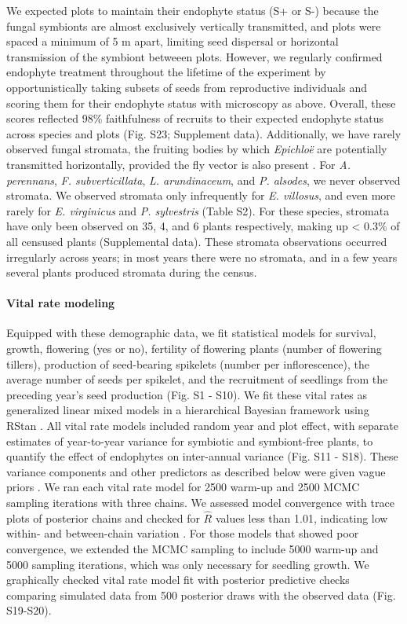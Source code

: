 \documentclass[12pt]{article}
\begin{document}
We expected plots to maintain their endophyte status (S+ or S-) because the fungal symbionts are almost exclusively vertically transmitted, and plots were spaced a minimum of 5 m apart, limiting seed dispersal or horizontal transmission of the symbiont betweeen plots. 
However, we regularly confirmed endophyte treatment throughout the lifetime of the experiment by opportunistically taking subsets of seeds from reproductive individuals and scoring them for their endophyte status with microscopy as above.
Overall, these scores reflected 98\% faithfulness of recruits to their expected endophyte status across species and plots (Fig. S23; Supplement data). 
Additionally, we have rarely observed fungal stromata, the fruiting bodies by which \emph{Epichlo\"e} are potentially transmitted horizontally, provided the fly vector is also present \cite{bultman1995mutualistic}. 
For \emph{A. perennans}, \emph{F. subverticillata}, \emph{L. arundinaceum}, and \emph{P. alsodes}, we never observed stromata. 
We observed stromata only infrequently for \emph{E. villosus}, and even more rarely for \emph{E. virginicus} and \emph{P. sylvestris} (Table S2). 
For these species, stromata have only been observed on 35, 4, and 6 plants respectively, making up < 0.3\% of all censused plants (Supplemental data).
These stromata observations occurred irregularly across years; in most years there were no stromata, and in a few years several plants produced stromata during the census. 

\paragraph*{Vital rate modeling}
Equipped with these demographic data, we fit statistical models for survival, growth, flowering (yes or no), fertility of flowering plants (number of flowering tillers), production of seed-bearing spikelets (number per inflorescence), the average number of seeds per spikelet, and the recruitment of seedlings from the preceding year's seed production (Fig. S1 - S10).  
We fit these vital rates as generalized linear mixed models in a hierarchical Bayesian framework using RStan \cite{rstan2022}. 
All vital rate models included random year and plot effect, with separate estimates of year-to-year variance for symbiotic and symbiont-free plants, to quantify the effect of endophytes on inter-annual variance (Fig. S11 - S18).
These variance components and other predictors as described below were given vague priors \cite{gabry2019visualization}.
We ran each vital rate model for 2500 warm-up and 2500 MCMC sampling iterations with three chains. 
We assessed model convergence with trace plots of posterior chains and checked for $\hat{R}$ values less than 1.01, indicating low within- and between-chain variation \cite{brooks1998general,gelman2006data}. 
For those models that showed poor convergence, we extended the MCMC sampling to include 5000 warm-up and 5000 sampling iterations, which was only necessary for seedling growth. 
We graphically checked vital rate model fit with posterior predictive checks comparing simulated data from 500 posterior draws with the observed data (Fig. S19-S20).
\end{document}
